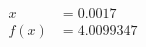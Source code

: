 \documentclass[preview]{standalone}
\begin{document}
\begin{align*}
x &= 0.0017\\f(x) &= 4.0099347
\end{align*}
\end{document}
